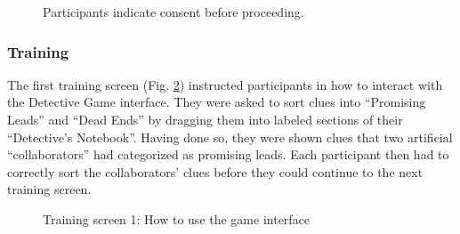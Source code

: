 \documentclass{article}
\begin{document}
\begin{figure}[h!]
\centering
{}
\caption{Participants indicate consent before proceeding.}
\label{fig:consent}
\end{figure}

\subsubsection{Training}

The first training screen (Fig. \ref{fig:training1}) instructed participants in how to interact with the Detective Game interface. They were asked to sort clues into ``Promising Leads'' and ``Dead Ends'' by dragging them into labeled sections of their ``Detective’s Notebook''. Having done so, they were shown clues that two artificial ``collaborators'' had categorized as promising leads. Each participant then had to correctly sort the collaborators' clues before they could continue to the next training screen.

\begin{figure}[h!]
\centering
{}
\caption{Training screen 1: How to use the game interface}
\label{fig:training1}
\end{figure}
\end{document}

